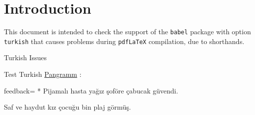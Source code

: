\documentclass{article}
\def\myquestiontext{ \underline{Pangramm} :}
\def\pangramme{Pijamal\i\ hasta ya\u{g}\i z \c{s}of\"ore \c{c}abucak 
  g\"uvendi.}
\def\pangrammeother{Saf ve haydut k\i z \c{c}ocu\u{g}u bin plaj 
  g\"orm\"u\c{s}.}
\def\myfeedback{}
\def\myquestiontext{ \underline{Pangramm} :}
\def\pangramme{Pijamalı hasta yağız şoföre çabucak güvendi.}
\def\pangrammeother{Saf ve haydut kız çocuğu bin plaj görmüş.}
\def\myfeedback{}
\begin{document}
\section*{Introduction}

This document is intended to check the support of the \texttt{babel} package 
with option \texttt{turkish} that causes problems during \texttt{pdfLaTeX} 
compilation, due to shorthands.

\begin{quiz}[points=1]{Turkish Issues}
\shorthandoff{=:!}%
\begin{multi}[feedback={}]{Test Turkish}
\myquestiontext
\item[feedback={\myfeedback}]* \pangramme
\item \pangrammeother
\end{multi}
\end{quiz}
\end{document}
